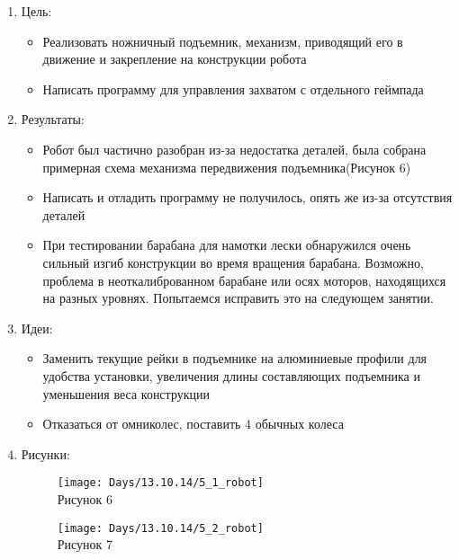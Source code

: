 
	\begin{enumerate}
		\item Цель:
		\begin{itemize}
			\item Реализовать ножничный подъемник, механизм, приводящий его в движение и закрепление на конструкции робота
			\item Написать программу для управления захватом с отдельного геймпада
		\end{itemize}
		\item Результаты:
		\begin{itemize}
			\item Робот был частично разобран из-за недостатка деталей, была собрана примерная схема механизма передвижения подъемника(Рисунок 6)
			\item Написать и отладить программу не получилось, опять же из-за отсутствия деталей
			\item При тестировании барабана для намотки лески обнаружился очень сильный изгиб конструкции во время вращения барабана. Возможно, проблема в неоткалиброванном барабане или осях моторов, находящихся на разных уровнях. Попытаемся исправить это на следующем занятии.
		\end{itemize}
		\item Идеи:
		\begin{itemize}
			\item Заменить текущие рейки в подъемнике на алюминиевые профили для удобства установки, увеличения длины составляющих подъемника и уменьшения веса конструкции
			\item Отказаться от омниколес, поставить 4 обычных колеса
		\end{itemize}
		\item Рисунки:
		\begin{figure} [h]
			\centering
			\begin{minipage}{0.3\linewidth}
				\texttt{[image: Days/13.10.14/5\_1\_robot]}\\ Рисунок 6
			\end{minipage}
			\begin{minipage}{0.3\linewidth}
				\texttt{[image: Days/13.10.14/5\_2\_robot]}\\ Рисунок 7
			\end{minipage}
		\end{figure}
	\end{enumerate}
	\clearpage
